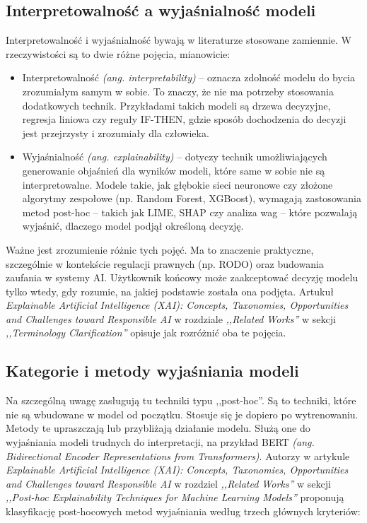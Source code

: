 \documentclass[wmii, inf, mgr]{uwmthesis}
\begin{document}
\subsection{Interpretowalność a wyjaśnialność modeli}
Interpretowalność i wyjaśnialność bywają w literaturze stosowane zamiennie. W rzeczywistości są to dwie różne pojęcia, mianowicie:

\begin{itemize}
    \item {Interpretowalność \textit{(ang. interpretability)}} -- oznacza zdolność modelu do bycia zrozumiałym samym w sobie. To znaczy, że nie ma potrzeby stosowania dodatkowych technik. Przykładami takich modeli są drzewa decyzyjne, regresja liniowa czy reguły IF-THEN, gdzie sposób dochodzenia do decyzji jest przejrzysty i zrozumiały dla człowieka.

    \item {Wyjaśnialność \textit{(ang. explainability)}} -- dotyczy technik umożliwiających generowanie objaśnień dla wyników modeli, które same w sobie nie są interpretowalne. Modele takie, jak głębokie sieci neuronowe czy złożone algorytmy zespołowe (np. Random Forest, XGBoost), wymagają zastosowania metod post-hoc -- takich jak LIME, SHAP czy analiza wag -- które pozwalają wyjaśnić, dlaczego model podjął określoną decyzję.
\end{itemize}

Ważne jest zrozumienie różnic tych pojęć. Ma to znaczenie praktyczne, szczególnie w kontekście regulacji prawnych (np. RODO) oraz budowania zaufania w systemy AI. Użytkownik końcowy może zaakceptować decyzję modelu tylko wtedy, gdy rozumie, na jakiej podstawie została ona podjęta. Artukuł \textit{Explainable Artificial Intelligence (XAI): Concepts, Taxonomies, Opportunities and Challenges toward Responsible AI} \cite{XAI} w rozdziale \textit{,,Related Works''} w sekcji \textit{,,Terminology Clarification''} opisuje jak rozróżnić oba te pojęcia.

\subsection{Kategorie i metody wyjaśniania modeli}
Na szczególną uwagę zasługują tu techniki typu ,,post-hoc''. Są to techniki, które nie są wbudowane w model od początku. Stosuje się je dopiero po wytrenowaniu. Metody te upraszczają lub przybliżają działanie modelu. Służą one do wyjaśniania modeli trudnych do interpretacji, na przykład BERT \textit{(ang. Bidirectional Encoder Representations from Transformers)}. Autorzy w artykule \textit{Explainable Artificial Intelligence (XAI): Concepts, Taxonomies, Opportunities and Challenges toward Responsible AI} \cite{XAI} w rozdziel \textit{,,Related Works''} w sekcji \textit{,,Post-hoc Explainability Techniques for Machine Learning Models''} proponują klasyfikację post-hocowych metod wyjaśniania według trzech głównych kryteriów:
\end{document}
